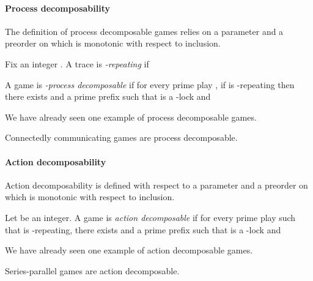 \documentclass[a4paper,UKenglish]{lipics-v2016}
\begin{document}
\paragraph*{Process decomposability}


The definition of process decomposable games relies on
a parameter  and a preorder  on 
which is 
monotonic with respect to inclusion.


\begin{definition}
Fix an integer .
A trace  is \emph{-repeating} if 

A game is \emph{-process decomposable}
if  for every prime play ,
if  is -repeating then
there exists 
and a prime prefix 
such that 
 is a  -lock 
and 

\end{definition}

We have already seen one example of process decomposable games.

\begin{lemma}\label{lem:pdec}
Connectedly communicating games
are process decomposable.
\end{lemma}


\paragraph*{Action decomposability}

\newcommand{\FF}{\mathcal{F}}

\newcommand{\dFF}{{\downarrow\FF}}














Action decomposability is defined with respect to a parameter 
and a preorder  on 
which is 
monotonic with respect to inclusion.

\begin{definition}
Let  be an integer.
A game is \emph{ action decomposable}
if  for every prime play 
such that
 is -repeating,
there exists 
and a prime prefix  such that 
 is a  -lock
and

\end{definition}



We have already seen one example of action decomposable games.

\begin{lemma}\label{lem:adec}
Series-parallel games
are action decomposable.
\end{lemma}
\end{document}
